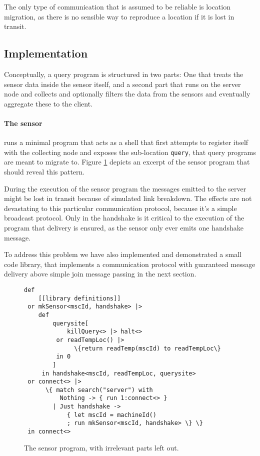 The only type of communication that is assumed to be reliable is location
migration, as there is no sensible way to reproduce a location if it is lost
in transit.

\subsection*{Implementation}

Conceptually, a query program is structured in two parts: One that treats the
sensor data inside the sensor itself, and a second part that runs on the server
node and collects and optionally filters the data from the sensors and
eventually aggregate these to the client.

\paragraph{The sensor} runs a minimal program that acts as a shell that first
attempts to register itself with the collecting node and exposes the
sub-location \texttt{query}, that query programs are meant to migrate to.
Figure \ref{fig:sensor-prog} depicts an excerpt of the sensor program that
should reveal this pattern.

During the execution of the sensor program the messages emitted to the server
might be lost in transit because of simulated link breakdown. The effects are
not devastating to this particular communication protocol, because it's a
simple broadcast protocol.  Only in the handshake is it critical to the
execution of the program that delivery is ensured, as the sensor only ever
emits one handshake message.

To address this problem we have also implemented and demonstrated a small code
library, that implements a communication protocol with guaranteed message
delivery above simple join message passing in the next section.

\begin{figure}[!h]
\begin{minipage}{0.97\textwidth}
\begin{verbatim}
def
    [[library definitions]]
 or mkSensor<mscId, handshake> |>
    def
        querysite[
            killQuery<> |> halt<>
         or readTempLoc() |>
              \{return readTemp(mscId) to readTempLoc\}
         in 0
        ]
     in handshake<mscId, readTempLoc, querysite>
 or connect<> |>
      \{ match search("server") with
          Nothing -> { run 1:connect<> }
        | Just handshake ->
            { let mscId = machineId()
            ; run mkSensor<mscId, handshake> \} \}
 in connect<>
\end{verbatim}
\end{minipage}
\caption{The sensor program, with irrelevant parts left out.}\label{fig:sensor-prog}
\end{figure}

